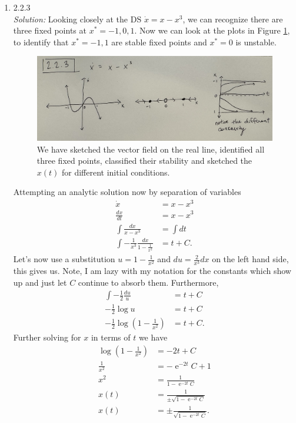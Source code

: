\documentclass[10pt]{amsart}
\DeclareMathOperator{\E}{e}
\theoremstyle{nonumberplain}
\begin{document}
\begin{enumerate}[label={\bf {\arabic*}:}]
\item 2.2.3 \\
\textit{Solution:}
Looking closely at the DS $\dot x = x - x^3$, we can recognize there are three fixed points at $x^* = -1, 0, 1$.
Now we can look at the plots in Figure \ref{fig:f1}, to identify that $x^* = -1, 1$ are stable fixed points and $x^* = 0$ is unstable.
\begin{figure}[h]
	\centering
	\includegraphics[width=1\textwidth]{2_2_3.png}
 	\caption{We have sketched the vector field on the real line, identified all three fixed points, classified their stability and sketched the $x(t)$ for different initial conditions.}\label{fig:f1}
\end{figure}

\noindent
Attempting an analytic solution now by separation of variables
\begin{align*}
\dot x &= x - x^3 \\
\frac {dx}{dt} &= x - x^3 \\
\int \frac {dx} {x - x^3} &= \int dt \\
\int - \frac 1 {x^3} \frac {dx} {1 - \frac 1 {x^2}} &= t + C.
\end{align*}
Let's now use a substitution $u = 1 - \frac 1 {x^2}$ and $du = \frac 2 {x^3} dx$ on the left hand side, this gives us.
Note, I am lazy with my notation for the constants which show up and just let $C$ continue to absorb them.
Furthermore,
\begin{align*}
\int - \frac 1 2 \frac {du} {u} &= t + C \\
- \frac 1 2 \log u &= t + C \\
- \frac 1 2 \log \left( 1 - \frac 1 {x^2} \right) &= t + C.
\end{align*}
Further solving for $x$ in terms of $t$ we have
\begin{align*}
\log \left( 1 - \frac 1 {x^2} \right) &= -2 t + C \\
\frac 1 {x^2}&= - \E^{-2 t}C + 1 \\
x^2 &= \frac 1 {1 - \E^{-2 t}C } \\
x(t) &= \frac 1 {\pm \sqrt {1 - \E^{-2 t}C }} \\
x(t) &= \pm \frac 1 { \sqrt {1 - \E^{-2 t}C }}.
\end{align*}


\end{enumerate}
\end{document}
